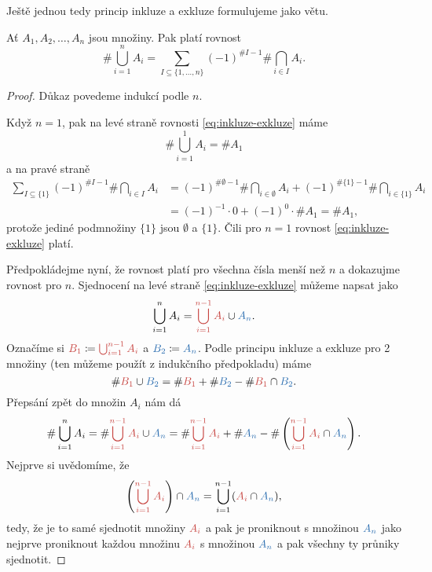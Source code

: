 Ještě jednou tedy princip inkluze a exkluze formulujeme jako větu.

\begin{theorem}
 \label{thm:princip-inkluze-a-exkluze}
 Ať $A_1,A_2,\ldots,A_n$ jsou množiny. Pak platí rovnost
 \begin{equation*}
  \label{eq:inkluze-exkluze}
  \tag{$\triangle$}
  \# \bigcup_{i=1}^{n} A_i = \sum_{I \subseteq \{1,\ldots,n\}}^{} (-1)^{\# I -
  1} \# \bigcap_{i \in  I}^{} A_i.
 \end{equation*}
\end{theorem}
\begin{proof}
 Důkaz povedeme indukcí podle $n$.

 Když $n = 1$, pak na levé straně rovnosti \eqref{eq:inkluze-exkluze} máme
 \[
  \# \bigcup_{i=1}^{1} A_i = \# A_1
 \]
 a na pravé straně
 \begin{align*}
  \sum_{I \subseteq \{1\}}^{} (-1)^{\# I - 1} \# \bigcap_{i \in  I}^{} A_i &=
  (-1)^{\#\emptyset-1} \# \bigcap_{i  \in \emptyset}^{} A_i + (-1)^{\#\{1\}-1}
  \# \bigcap_{i  \in \{1\}}^{} A_i\\
  &= (-1)^{-1} \cdot 0 + (-1)^{0} \cdot \# A_1 = \# A_1,
 \end{align*}
 protože jediné podmnožiny $\{1\}$ jsou $\emptyset$ a $\{1\}$. Čili pro $n = 1$ 
 rovnost \eqref{eq:inkluze-exkluze} platí.

 Předpokládejme nyní, že rovnost platí pro všechna čísla menší než $n$ a
 dokazujme rovnost pro $n$. Sjednocení na levé straně \eqref{eq:inkluze-exkluze}
 můžeme napsat jako
 \[
  \bigcup_{i=1}^{n} A_i = \clr{\bigcup_{i=1}^{n-1} A_i} \cup \clb{A_n}.
 \]
 Označíme si $\clr{B_1} \coloneqq \clr{\bigcup_{i=1}^{n-1} A_i}$ a $\clb{B_2}
 \coloneqq \clb{A_n}$. Podle principu inkluze a exkluze pro 2 množiny (ten
 můžeme použít z indukčního předpokladu) máme
 \[
  \# \clr{B_1} \cup \clb{B_2} = \# \clr{B_1} + \# \clb{B_2} - \# \clr{B_1} \cap
  \clb{B_2}.
 \]
 Přepsání zpět do množin $A_i$ nám dá
 \[
  \# \bigcup_{i=1}^{n} A_i= \# \clr{\bigcup_{i=1}^{n-1} A_i} \cup \clb{A_n} = \#
  \clr{\bigcup_{i=1}^{n-1} A_i} + \# \clb{A_n} - \#
  \left(\clr{\bigcup_{i=1}^{n-1} A_i} \cap \clb{A_n}\right).
 \]
 Nejprve si uvědomíme, že
 \[
  \left(\clr{\bigcup_{i=1}^{n-1} A_i}\right) \cap \clb{A_n} =
  \bigcup_{i=1}^{n-1} (\clr{A_i} \cap \clb{A_n}),
 \]
 tedy, že je to samé sjednotit množiny $\clr{A_i}$ a pak je proniknout s
 množinou $\clb{A_n}$ jako nejprve proniknout každou množinu $\clr{A_i}$ s
 množinou $\clb{A_n}$ a pak všechny ty průniky sjednotit.


\end{proof}
